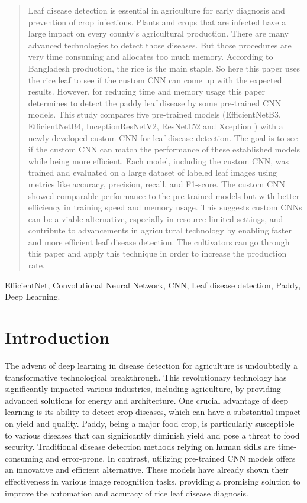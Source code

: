 \documentclass[conference]{IEEEtran}
\begin{document}
\begin{abstract}
    Leaf disease detection is essential in agriculture for early diagnosis and prevention of crop infections. Plants and crops that are infected have a large impact on every county’s agricultural production. There are many advanced technologies to detect those diseases. But those procedures are very time consuming and allocates too much memory. According to Bangladesh production, the rice is the main staple. So here this paper uses the rice leaf to see if the custom CNN can come up with the expected results. However, for reducing time and memory usage this paper determines to detect the paddy leaf disease by some pre-trained CNN models. This study compares five pre-trained models (EfficientNetB3, EfficientNetB4, InceptionResNetV2, ResNet152 and Xception ) with a newly developed custom CNN for leaf disease detection. The goal is to see if the custom CNN can match the performance of these established models while being more efficient. Each model, including the custom CNN, was trained and evaluated on a large dataset of labeled leaf images using metrics like accuracy, precision, recall, and F1-score. The custom CNN showed comparable performance to the pre-trained models but with better efficiency in training speed and memory usage. This suggests custom CNNs can be a viable alternative, especially in resource-limited settings, and contribute to advancements in agricultural technology by enabling faster and more efficient leaf disease detection. The cultivators can go through this paper and apply this technique in order to increase the production rate. 
\end{abstract}

\begin{IEEEkeywords}
EfficientNet, Convolutional Neural Network, CNN, Leaf disease detection, Paddy, Deep Learning.
\end{IEEEkeywords}

\section{Introduction}
The advent of deep learning in disease detection for agriculture is undoubtedly a transformative technological breakthrough. This revolutionary technology has significantly impacted various industries, including agriculture, by providing advanced solutions for energy and architecture. One crucial advantage of deep learning is its ability to detect crop diseases, which can have a substantial impact on yield and quality. Paddy, being a major food crop, is particularly susceptible to various diseases that can significantly diminish yield and pose a threat to food security. Traditional disease detection methods relying on human skills are time-consuming and error-prone. In contrast, utilizing pre-trained CNN models offers an innovative and efficient alternative. These models have already shown their effectiveness in various image recognition tasks, providing a promising solution to improve the automation and accuracy of rice leaf disease diagnosis.
\end{document}
